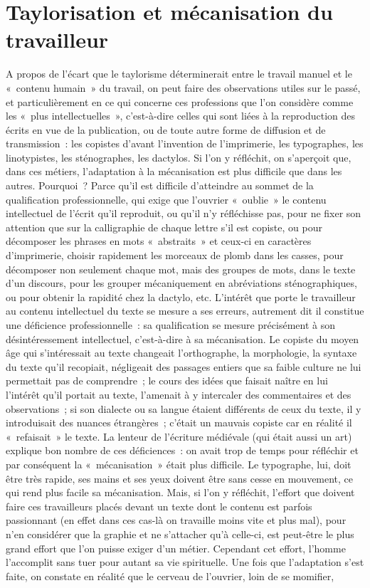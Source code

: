 \documentclass[french,twoside]{book} %
\begin{document}
\section[{Taylorisation et mécanisation du travailleur}]{Taylorisation et mécanisation du travailleur}
\noindent A propos de l’écart que le taylorisme déterminerait entre le travail manuel et le « contenu humain » du travail, on peut faire des observations utiles sur le passé, et particulièrement en ce qui concerne ces professions que l’on considère comme les « plus intellectuelles », c’est-à-dire celles qui sont liées à la reproduction des écrits en vue de la publication, ou de toute autre forme de diffusion et de transmission : les copistes d’avant l’invention de l’imprimerie, les typographes, les linotypistes, les sténographes, les dactylos. Si l’on y réfléchit, on s’aperçoit que, dans ces métiers, l’adaptation à la mécanisation est plus difficile que dans les autres. Pourquoi ? Parce qu’il est difficile d’atteindre au sommet de la qualification professionnelle, qui exige que l’ouvrier « oublie » le contenu intellectuel de l’écrit qu’il reproduit, ou qu’il n’y réfléchisse pas, pour ne fixer son attention que sur la calligraphie de chaque lettre s’il est copiste, ou pour décomposer les phrases en mots « abstraits » et ceux-ci en caractères d’imprimerie, choisir rapidement les morceaux de plomb dans les casses, pour décomposer non seulement chaque mot, mais des groupes de mots, dans le texte d’un discours, pour les grouper mécaniquement en abréviations sténographiques, ou pour obtenir la rapidité chez la dactylo, etc. L'intérêt que porte le travailleur au contenu intellectuel du texte se mesure a ses erreurs, autrement dit il constitue une déficience professionnelle : sa qualification se mesure précisément à son désintéressement intellectuel, c’est-à-dire à sa mécanisation. Le copiste du moyen âge qui s’intéressait au texte changeait l’orthographe, la morphologie, la syntaxe du texte qu’il recopiait, négligeait des passages entiers que sa faible culture ne lui permettait pas de comprendre ; le cours des idées que faisait naître en lui l’intérêt qu’il portait au texte, l’amenait à y intercaler des commentaires et des observations ; si son dialecte ou sa langue étaient différents de ceux du texte, il y introduisait des nuances étrangères ; c’était un mauvais copiste car en réalité il « refaisait » le texte. La lenteur de l’écriture médiévale (qui était aussi un art) explique bon nombre de ces déficiences : on avait trop de temps pour réfléchir et par conséquent la « mécanisation » était plus difficile. Le typographe, lui, doit être très rapide, ses mains et ses yeux doivent être sans cesse en mouvement, ce qui rend plus facile sa mécanisation. Mais, si l’on y réfléchit, l’effort que doivent faire ces travailleurs placés devant un texte dont le contenu est parfois passionnant (en effet dans ces cas-là on travaille moins vite et plus mal), pour n’en considérer que la graphie et ne s’attacher qu’à celle-ci, est peut-être le plus grand effort que l’on puisse exiger d’un métier. Cependant cet effort, l’homme l’accomplit sans tuer pour autant sa vie spirituelle. Une fois que l’adaptation s’est faite, on constate en réalité que le cerveau de l’ouvrier, loin de se momifier, 
\end{document}
